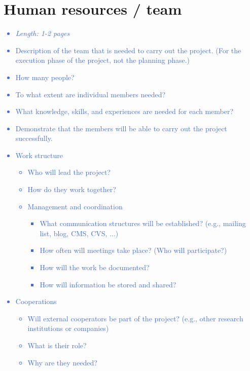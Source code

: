 \documentclass[a4paper,11pt]{article}
\providecommand*{\note}[1]{\small \textcolor{RoyalBlue}{\begin{minipage}{\textwidth}{#1}\end{minipage}}}
\begin{document}
\section{Human resources / team}
\label{sect:team}

\note{
\begin{itemize}
\item {\em Length: 1-2 pages}
\item Description of the team that is needed to carry out the project. (For the execution phase of the project, not the planning phase.)
\item How many people?
\item To what extent are individual members needed?
\item What knowledge, skills, and experiences are needed for each member?
\item Demonstrate that the members will be able to carry out the project successfully.
\item Work structure
	\begin{itemize}
	\item     Who will lead the project?
	\item     How do they work together?
	\item     Management and coordination
		\begin{itemize}
		\item 	        What communication structures will be established? (e.g., mailing list, blog, CMS, CVS, ...)
		\item 	        How often will meetings take place? (Who will participate?)
		\item 	        How will the work be documented?
		\item 	        How will information be stored and shared?
		\end{itemize}
	\end{itemize}
\item Cooperations
	\begin{itemize}
	\item     Will external cooperators be part of the project? (e.g., other research institutions or companies)
	\item     What is their role?
	 \item    Why are they needed?
	\end{itemize}
\end{itemize}
}

\end{document}
